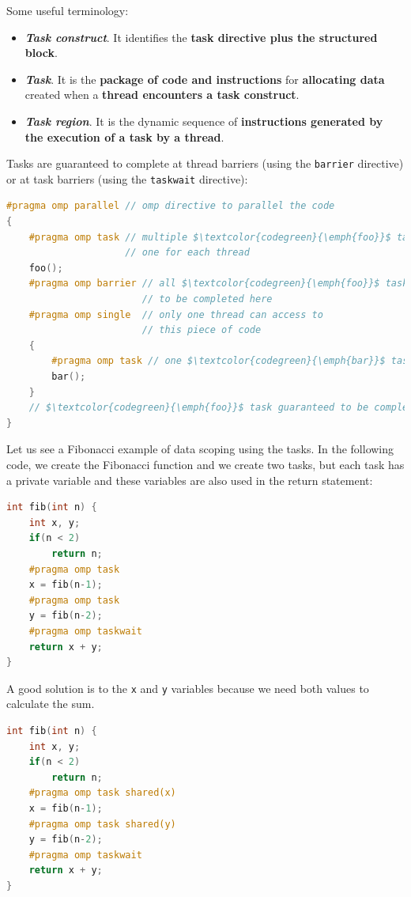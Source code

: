 \highspace
Some useful terminology:
\begin{itemize}
    \item \textbf{\emph{Task construct}}. It identifies the \textbf{task directive plus the structured block}.
    
    \item \textbf{\emph{Task}}. It is the \textbf{package of code and instructions} for \textbf{allocating data} created when a \textbf{thread encounters a task construct}.
    
    \item \textbf{\emph{Task region}}. It is the dynamic sequence of \textbf{instructions generated by the execution of a task by a thread}.
\end{itemize}
Tasks are guaranteed to complete at thread barriers (using the \texttt{barrier} directive) or at task barriers (using the \texttt{taskwait} directive):
\begin{lstlisting}[language=C++, mathescape=true]
#pragma omp parallel // omp directive to parallel the code
{
    #pragma omp task // multiple $\textcolor{codegreen}{\emph{foo}}$ tasks created here, 
                     // one for each thread
    foo();
    #pragma omp barrier // all $\textcolor{codegreen}{\emph{foo}}$ tasks guaranteed 
                        // to be completed here
    #pragma omp single  // only one thread can access to 
                        // this piece of code
    {
        #pragma omp task // one $\textcolor{codegreen}{\emph{bar}}$ task created here
        bar();
    }
    // $\textcolor{codegreen}{\emph{foo}}$ task guaranteed to be completed here
}
\end{lstlisting}
\begin{examplebox}
    Let us see a Fibonacci example of data scoping using the tasks. In the following code, we create the Fibonacci function and we create two tasks, but each task has a private variable and these variables are also used in the return statement:
    \begin{lstlisting}[language=C++]
int fib(int n) {
    int x, y;
    if(n < 2)
        return n;
    #pragma omp task
    x = fib(n-1);
    #pragma omp task
    y = fib(n-2);
    #pragma omp taskwait
    return x + y;
}\end{lstlisting}
    A good solution is to  the \texttt{x} and \texttt{y} variables because we need both values to calculate the sum.
    \begin{lstlisting}[language=C++]
int fib(int n) {
    int x, y;
    if(n < 2)
        return n;
    #pragma omp task shared(x)
    x = fib(n-1);
    #pragma omp task shared(y)
    y = fib(n-2);
    #pragma omp taskwait
    return x + y;
}\end{lstlisting}
\end{examplebox}

